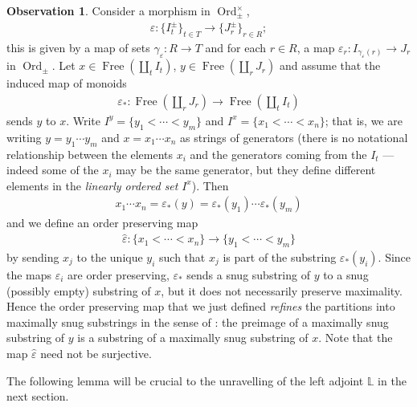 \documentclass[12pt, reqno]{amsart}
\theoremstyle{plain}
\theoremstyle{definition}
\newtheorem{observation}[theorem]{Observation}
\renewcommand{\epsilon}{\varepsilon}
\begin{document}
\begin{observation}\label{refining maximally snug substrings}
Consider a morphism in $\operatorname{Ord}_\pm^\times$,
\begin{align*}
\epsilon\colon \{I_t^\pm \}_{t\in T} \longrightarrow \{J_r^\pm \}_{r\in R};
\end{align*}
this is given by a map of sets $\gamma_\epsilon\colon R\rightarrow T$ and for each $r\in R$, a map $\epsilon_r\colon I_{\gamma_\epsilon(r)}\rightarrow J_r$ in $\operatorname{Ord}_\pm$. Let $x\in \operatorname{Free}(\coprod_t I_t)$, $y\in \operatorname{Free}(\coprod_r J_r)$ and assume that the induced map of monoids
\begin{align*}
\epsilon_*\colon \operatorname{Free}(\coprod_r J_r)\rightarrow \operatorname{Free}(\coprod_t I_t)
\end{align*}
sends $y$ to $x$. Write $I^y=\{y_1<\cdots < y_m\}$ and $I^x=\{x_1<\cdots <x_n\}$; that is, we are writing $y=y_1\cdots y_m$ and $x=x_1\cdots x_n$ as strings of generators (there is no notational relationship between the elements $x_i$ and the generators coming from the $I_t$ --- indeed some of the $x_i$ may be the same generator, but they define different elements in the \textit{linearly ordered set} $I^x$). Then 
\begin{align*}
x_1\cdots x_n =\epsilon_*(y)=\epsilon_*(y_1) \cdots \epsilon_*(y_m)
\end{align*}
and we define an order preserving map
\begin{align*}
\hat{\epsilon}\colon\{x_1<\cdots <x_n\}\rightarrow \{y_1<\cdots < y_m\}
\end{align*}
by sending $x_j$ to the unique $y_i$ such that $x_j$ is part of the substring $\epsilon_*(y_i)$. Since the maps $\epsilon_i$ are order preserving, $\epsilon_*$ sends a snug substring of $y$ to a snug (possibly empty) substring of $x$, but it does not necessarily preserve maximality. Hence the order preserving map that we just defined \textit{refines} the partitions into maximally snug substrings in the sense of : the preimage of a maximally snug substring of $y$ is a substring of a maximally snug substring of $x$. Note that the map $\hat{\epsilon}$ need not be surjective.
\end{observation}

The following lemma will be crucial to the unravelling of the left adjoint $\mathbb{L}$ in the next section.
\end{document}
